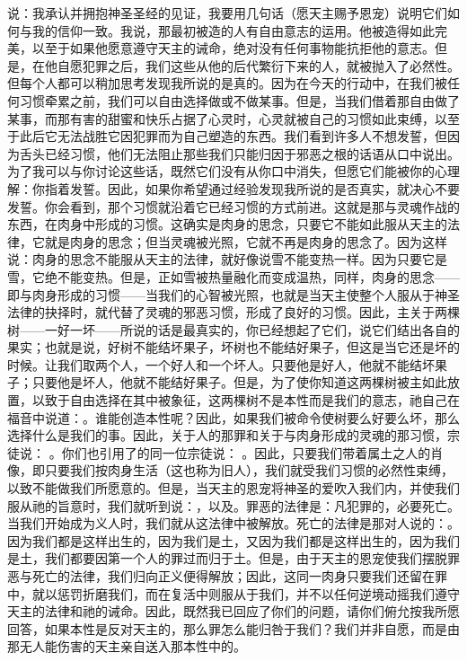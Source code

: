 说：我承认并拥抱神圣圣经的见证，我要用几句话（愿天主赐予恩宠）说明它们如何与我的信仰一致。我说，那最初被造的人有自由意志的运用。他被造得如此完美，以至于如果他愿意遵守天主的诫命，绝对没有任何事物能抗拒他的意志。但是，在他自愿犯罪之后，我们这些从他的后代繁衍下来的人，就被抛入了必然性。但每个人都可以稍加思考发现我所说的是真的。因为在今天的行动中，在我们被任何习惯牵累之前，我们可以自由选择做或不做某事。但是，当我们借着那自由做了某事，而那有害的甜蜜和快乐占据了心灵时，心灵就被自己的习惯如此束缚，以至于此后它无法战胜它因犯罪而为自己塑造的东西。我们看到许多人不想发誓，但因为舌头已经习惯，他们无法阻止那些我们只能归因于邪恶之根的话语从口中说出。为了我可以与你讨论这些话，既然它们没有从你口中消失，但愿它们能被你的心理解：你指着发誓。因此，如果你希望通过经验发现我所说的是否真实，就决心不要发誓。你会看到，那个习惯就沿着它已经习惯的方式前进。这就是那与灵魂作战的东西，在肉身中形成的习惯。这确实是肉身的思念，只要它不能如此服从天主的法律，它就是肉身的思念；但当灵魂被光照，它就不再是肉身的思念了。因为这样说：肉身的思念不能服从天主的法律，就好像说雪不能变热一样。因为只要它是雪，它绝不能变热。但是，正如雪被热量融化而变成温热，同样，肉身的思念——即与肉身形成的习惯——当我们的心智被光照，也就是当天主使整个人服从于神圣法律的抉择时，就代替了灵魂的邪恶习惯，形成了良好的习惯。因此，主关于两棵树——一好一坏——所说的话是最真实的，你已经想起了它们，说它们结出各自的果实；也就是说，好树不能结坏果子，坏树也不能结好果子，但这是当它还是坏的时候。让我们取两个人，一个好人和一个坏人。只要他是好人，他就不能结坏果子；只要他是坏人，他就不能结好果子。但是，为了使你知道这两棵树被主如此放置，以致于自由选择在其中被象征，这两棵树不是本性而是我们的意志，祂自己在福音中说道：。谁能创造本性呢？因此，如果我们被命令使树要么好要么坏，那么选择什么是我们的事。因此，关于人的那罪和关于与肉身形成的灵魂的那习惯，宗徒说： 。你们也引用了的同一位宗徒说： 。因此，只要我们带着属土之人的肖像，即只要我们按肉身生活（这也称为旧人），我们就受我们习惯的必然性束缚，以致不能做我们所愿意的。但是，当天主的恩宠将神圣的爱吹入我们内，并使我们服从祂的旨意时，我们就听到说：，以及。罪恶的法律是：凡犯罪的，必要死亡。当我们开始成为义人时，我们就从这法律中被解放。死亡的法律是那对人说的：。因为我们都是这样出生的，因为我们是土，又因为我们都是这样出生的，因为我们是土，我们都要因第一个人的罪过而归于土。但是，由于天主的恩宠使我们摆脱罪恶与死亡的法律，我们归向正义便得解放；因此，这同一肉身只要我们还留在罪中，就以惩罚折磨我们，而在复活中则服从于我们，并不以任何逆境动摇我们遵守天主的法律和祂的诫命。因此，既然我已回应了你们的问题，请你们俯允按我所愿回答，如果本性是反对天主的，那么罪怎么能归咎于我们？我们并非自愿，而是由那无人能伤害的天主亲自送入那本性中的。\par

